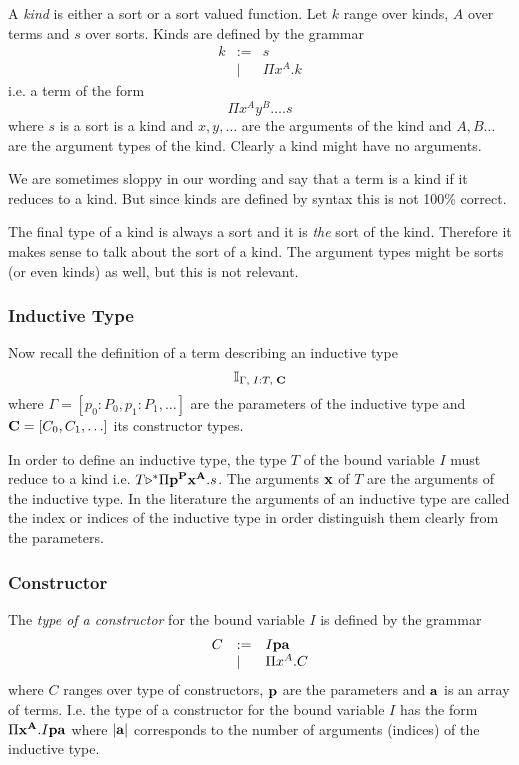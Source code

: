 \begin{definition}
  A \emph{kind} is either a sort or a sort valued function. Let $k$ range
  over kinds, $A$ over terms and $s$ over sorts. Kinds are defined by the
  grammar
  $$
  \begin{array}{lll}
    k
    &:=& s
    \\
    &\mid& \Pi x^A. k
  \end{array}
  $$
  i.e. a term of the form
  $$
  \Pi x^A y^B \ldots . s
  $$
  where $s$ is a sort is a kind and $x, y, \ldots$ are the arguments of the
  kind and $A, B \ldots$ are the argument types of the kind. Clearly a kind
  might have no arguments.

  We are sometimes sloppy in our wording and say that a term is a kind if it
  reduces to a kind. But since kinds are defined by syntax this is not 100\%
  correct.

  The final type of a kind is always a sort and it is \emph{the} sort of the
  kind. Therefore it makes sense to talk about the sort of a kind. The
  argument types might be sorts (or even kinds) as well, but this is not
  relevant.
\end{definition}



\subsubsection{Inductive Type}

Now recall the definition of a term describing an inductive type
$$
\mathbb{I}_{\Gamma, \; I:T, \; \mathbf{C}}
$$
where $\Gamma = [p_0:P_0, p_1: P_1, \ldots]$ are the parameters of the
inductive type and $\mathbf{C} = [C_0, C_1, \ldots]$ its constructor types.

In order to define an inductive type, the type $T$ of the bound variable $I$
must reduce to a kind i.e. $T {\mathrel{\triangleright}}^* \Pi \mathbf{p}^{\mathbf{P}} \mathbf{x}^{\mathbf{A}}. s$. The
arguments $\mathbf{x}$ of $T$ are the arguments of the inductive type. In the
literature the arguments of an inductive type are called the index or indices of
the inductive type in order distinguish them clearly from the parameters.





\subsubsection{Constructor}

\begin{definition}
  The \emph{type of a constructor} for the bound variable $I$ is defined by
  the grammar
  $$
  \begin{array}{lll}
    C
    &:= & I \mathbf{p} \mathbf{a}
    \\
    &\mid& \Pi x^A . C
  \end{array}
  $$
  where $C$ ranges over type of constructors, $\mathbf{p}$ are the parameters and
  $\mathbf{a}$ is an array of terms. I.e. the type of a constructor for the bound
  variable $I$ has the form $\Pi \mathbf{x}^{\mathbf{A}}. I \mathbf{p}  \mathbf{a}$ where
  $|\mathbf{a}|$ corresponds to the number of arguments (indices) of the inductive
  type.
\end{definition}

